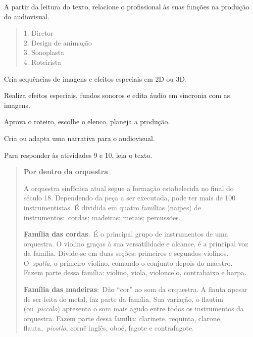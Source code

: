 \begin{escolha}
\begin{quote}
\end{quote}

A partir da leitura do texto, relacione o profissional às suas funções
na produção do audiovisual.

\begin{quote}
1. Diretor\\
2. Design de animação\\
3.  Sonoplasta\\
4. Roteirista
\end{quote}

\begin{boxlist}
\item Cria sequências de imagens e efeitos especiais em 2D ou 3D. 

\item Realiza efeitos especiais, fundos sonoros e edita áudio em sincronia com as imagens. 

\item Aprova o roteiro, escolhe o elenco, planeja a produção. 

\item Cria ou adapta uma narrativa para o audiovisual. 
\end{boxlist}


Para responder às atividades 9 e 10, leia o texto.

\begin{quote}
\textbf{Por dentro da orquestra}

A orquestra sinfônica atual segue a formação
estabelecida no final do século 18. Dependendo da peça a ser executada,
pode ter mais de 100 instrumentistas. É dividida em quatro famílias
(naipes) de instrumentos:~cordas; madeiras; metais; percussões.

\textbf{Família das cordas}:~É o principal grupo de instrumentos de uma
orquestra. O violino graças à sua versatilidade e alcance, é a principal
voz da família. Divide-se em duas seções: primeiros e segundos violinos.
O~\emph{spalla}, o primeiro violino, comando o conjunto depois do
maestro. Fazem parte dessa família: violino, viola, violoncelo,
contrabaixo e harpa.

\textbf{Família das madeiras}:~Dão ``cor'' ao som da orquestra. A flauta
apesar de ser feita de metal, faz parte da família. Sua variação, o
flautim (ou~\emph{piccolo}) apresenta o som mais agudo entre todos os
instrumentos da orquestra. Fazem parte dessa família: clarinete,
requinta, clarone, flauta,~\emph{picollo}, cornê inglês, oboé, fagote e
contrafagote.


\end{quote}
\end{escolha}
